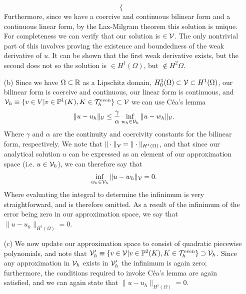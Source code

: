 \documentclass{article}
\begin{document}
\begin{itemize}
\begin{equation*}
\begin{cases}
		\end{cases}
	\end{equation*}
	Furthermore, since we have a coercive and continuous bilinear form and a continuous linear form, by the Lax-Milgram theorem this solution is unique. For completeness we can verify that our solution is \(\in \mathcal{V} \). The only nontrivial part of this involves proving the existence and boundedness of the weak derivative of \(u\). It can be shown that the first weak derivative exists, but the second does not so the solution is \(\in H^1(\Omega) \), but \(\notin H^2{\Omega} \).%
	
	\item[(b)] Since we have \(\Omega \subset \mathbb{R} \) as a Lipschitz domain, \(H^1_0(\Omega) \subset \mathcal{V} \subset H^1(\Omega) \), our bilinear form is coercive and continuous, our linear form is continuous, and \(\mathcal{V}_h \equiv \{v\in V | v \in \mathbb{P}^1(K), K \in \mathcal{T}_h^\text{even} \} \subset \mathcal{V} \) we can use C\'ea's lemma 
	\begin{equation*}
		\|u - u_h\|_{\mathcal{V}} \leq \dfrac{\gamma}{\alpha}\inf\limits_{w_h \in \mathcal{V}_h}\|u - w_h\|_{\mathcal{V}}.
	\end{equation*}
	Where \(\gamma \) and \(\alpha \) are the continuity and coercivity constants for the bilinear form, respectively. We note that \(\|\cdot\|_{\mathcal{V}} = \|\cdot\|_{H^1(\Omega)} \), and that since our analytical solution \(u\) can be expressed as an element of our approximation space (i.e. \(u \in \mathcal{V}_h \)), we can therefore say that 
	\begin{equation*}
		\inf\limits_{w_h \in \mathcal{V}_h}\|u - w_h\|_{\mathcal{V}} = 0.
	\end{equation*}
	Where evaluating the integral to determine the infinimum is very straightforward, and is therefore omitted. As a result of the infinimum of the error being zero in our approximation space, we say that \(\|u-u_h\|_{H^1(\Omega)} = 0\).
	
	\item[(c)] We now update our approximation space to consist of quadratic piecewise polynomials, and note that \(\mathcal{V}'_h \equiv \{v\in \mathcal{V} | v \in \mathbb{P}^2(K), K \in \mathcal{T}_h^\text{even} \} \supset \mathcal{V}_h \). Since any approximation in \(\mathcal{V}_h \) exists in \(\mathcal{V}'_h \) the infinimum is again zero; furthermore, the conditions required to invoke C\'ea's lemma are again satisfied, and we can again state that \(\|u-u_h\|_{H^1(\Omega)} = 0\).
	

\end{itemize}
\end{document}
